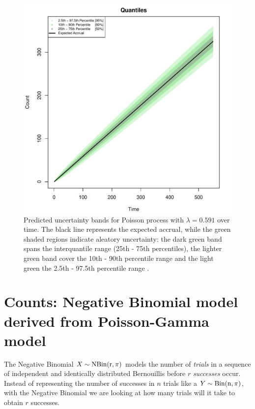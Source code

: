 \begin{figure}
\begin{knitrout}
\color{fgcolor}

{\centering \includegraphics[width=\textwidth-3cm]{figure/ch02_figunnamed-chunk-6-1} 

}


\end{knitrout}
  \caption{Predicted uncertainty bands for Poisson process with $\lambda = 0.591$ over time. The black line represents the expected accrual, while the green shaded regions indicate aleatory uncertainty: the dark green band spans the interquantile range (25th - 75th percentiles), the lighter green band cover the 10th - 90th percentile range and the light green the 2.5th - 97.5th percentile range \citep{spiegelhalter2011visualizing}.}
  \label{fig:2_5}
\end{figure}
\newpage
\section{Counts: Negative Binomial model derived from Poisson-Gamma model}

The Negative Binomial $X\sim\rm{NBin}(r,\pi)$ models the number of 
\textit{trials} in a sequence of independent and identically distributed Bernouillis before $r$ \textit{successes} occur. Instead of representing the number of successes in $n$ trials like a $Y\sim \rm{Bin} (n, \pi)$, with the Negative Binomial we are looking at how many trials will it take to obtain $r$ successes.

